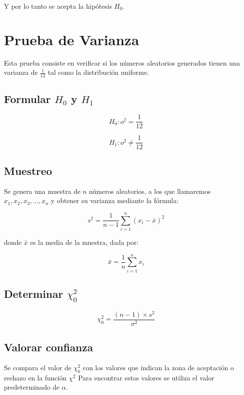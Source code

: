 Y por lo tanto se acepta la hipótesis $H_0$.

\section{Prueba de Varianza}


Esta prueba consiste en verificar si los números aleatorios generados tienen una varianza de $\frac{1}{12}$ 
tal como la distribución uniforme.

\subsection{Formular $H_0$ y $H_1$}
$$H_0: o^2  = \frac{1}{12}$$

$$H_1: o^2  \not= \frac{1}{12}$$

\subsection{Muestreo}
Se genera una muestra de $n$ números aleatorios, a los que llamaremos $x_1, x_2, x_3, \dots, x_n$ y obtener su varianza mediante la fórmula:

\[
s^2 = \frac{1}{n-1} \sum_{i=1}^{n} (x_i - \bar{x})^2
\]

donde \( \bar{x} \) es la media de la muestra, dada por:

\[
\bar{x} = \frac{1}{n} \sum_{i=1}^{n} x_i
\]

\subsection{Determinar $\chi^2_0$}

$$\chi^2_0 = \frac{(n-1)\times s^2}{\sigma^2}$$

\subsection{Valorar confianza}
Se compara el valor de $\chi^2_0$ con los valores que indican la zona de aceptación o rechazo en la función $\chi^2$
Para encontrar estos valores se utiliza el valor predeterminado de $\alpha$.

